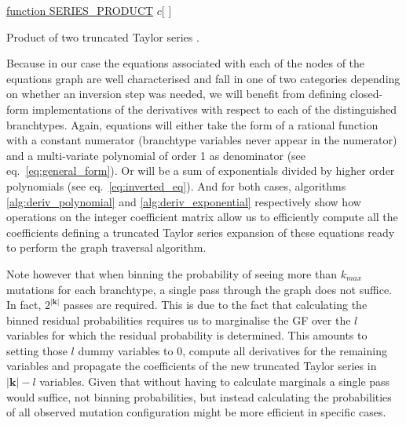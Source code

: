 \documentclass[10pt, a4]{article}
\begin{document}
\begin{algorithm}\label{alg:product}

    \underline{function SERIES\_PRODUCT}\;
    \Return $c$[ ]\;
    \caption{Product of two truncated Taylor series \citep{Neidinger2013}.}
\end{algorithm}


Because in our case the equations associated with each of the nodes of the equations graph are well characterised and fall in one of two categories depending on whether an inversion step was needed, we will benefit from defining closed-form implementations of the derivatives with respect to each of the distinguished branchtypes. Again, equations will either take the form of a rational function with a constant numerator (branchtype variables never appear in the numerator) and a multi-variate polynomial of order 1 as denominator (see eq.\ \ref{eq:general_form}). Or will be a sum of exponentials divided by higher order polynomials (see eq.\ \ref{eq:inverted_eq}). And for both cases, algorithms \ref{alg:deriv_polynomial} and \ref{alg:deriv_exponential} respectively show how operations on the integer coefficient matrix allow us to efficiently compute all the coefficients defining a truncated Taylor series expansion of these equations ready to perform the graph traversal algorithm.

Note however that when binning the probability of seeing more than $k_{max}$ mutations for each branchtype, a single pass through the graph does not suffice. In fact, $2^{|\boldsymbol{k}|}$ passes are required. This is due to the fact that calculating the binned residual probabilities requires us to marginalise the GF over the $l$ variables for which the residual probability is determined. This amounts to setting those $l$ dummy variables to $0$, compute all derivatives for the remaining variables and propagate the coefficients of the new truncated Taylor series in $|\boldsymbol{k}| - l$ variables. Given that without having to calculate marginals a single pass would suffice, not binning probabilities, but instead calculating the probabilities of all observed mutation configuration might be more efficient in specific cases.
\end{document}
